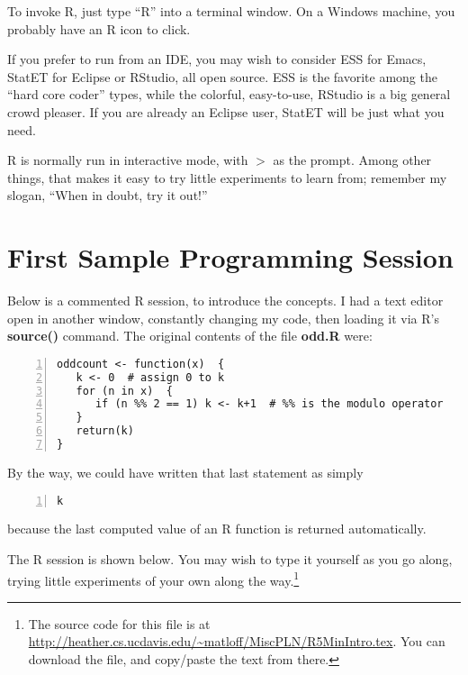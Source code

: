 To invoke R, just type ``R'' into a terminal window. On a Windows
machine, you probably have an R icon to click.

If you prefer to run from an IDE, you may wish to consider ESS for
Emacs, StatET for Eclipse or RStudio, all open source.  ESS is the
favorite among the ``hard core coder'' types, while the colorful,
easy-to-use, RStudio is a big general crowd pleaser.  If you are already
an Eclipse user, StatET will be just what you need.

R is normally run in interactive mode, with $>$ as the prompt.  Among
other things, that makes it easy to try little experiments to learn
from; remember my slogan, ``When in doubt, try it out!''

\section{First Sample Programming Session}

Below is a commented R session, to introduce the concepts. I had a text
editor open in another window, constantly changing my code, then loading
it via R's {\bf source()} command.  The original contents of the file
{\bf odd.R} were:

\begin{lstlisting}[numbers=left]
oddcount <- function(x)  {
   k <- 0  # assign 0 to k
   for (n in x)  {
      if (n %% 2 == 1) k <- k+1  # %% is the modulo operator
   }
   return(k)
}
\end{lstlisting}

By the way, we could have written that last statement as simply

\begin{lstlisting}[numbers=left]
   k
\end{lstlisting}

because the last computed value of an R function is returned
automatically.

The R session is shown below.  You may wish to type it yourself as you
go along, trying little experiments of your own along the
way.\footnote{The source code for this file is at
\url{http://heather.cs.ucdavis.edu/~matloff/MiscPLN/R5MinIntro.tex}.
You can download the file, and copy/paste the text from there.}

